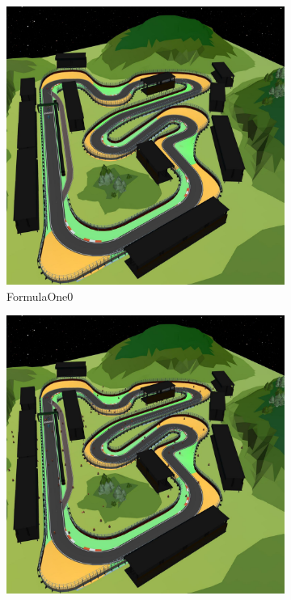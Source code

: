 \documentclass{article}
\begin{document}
\begin{figure}[H]
    \centering
      \begin{subfigure}{0.3\linewidth}
        \centering
        \includegraphics[width=\linewidth]{assets/appendix/formula_one0.pdf}
        \caption{FormulaOne0}
      \end{subfigure}
      \begin{subfigure}{0.3\linewidth}
        \centering
        \includegraphics[width=\linewidth]{assets/appendix/formula_one1.pdf}

\end{subfigure}
\end{figure}
\end{document}
